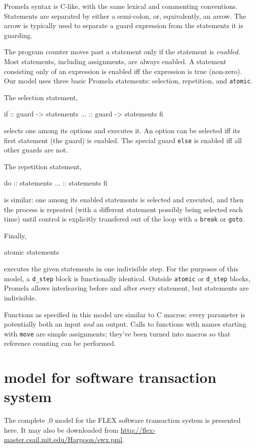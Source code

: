Promela syntax is C-like, with the same lexical and commenting
conventions.  Statements are separated by either a semi-colon, or,
equivalently, an arrow.  The arrow is typically used to separate a
guard expression from the statements it is guarding.

The program counter moves past a statement only if the statement is
{\it enabled}.  Most
statements, including assignments, are always enabled.
A statement consisting only of an expression is enabled iff the
expression is true (non-zero).
Our model uses three basic Promela statements: selection, repetition,
and {\tt atomic}.

The selection statement,
\begin{inlinecode}
if
:: guard -> statements
...
:: guard -> statements
fi
\end{inlinecode}
selects one among its options and executes it.  An option can be
selected iff its first statement (the guard) is enabled.  The
special guard {\tt else} is enabled iff all other guards are not.

The repetition statement,
\begin{inlinecode}
do
:: statements
...
:: statements
fi
\end{inlinecode}
is similar: one among its enabled statements is selected and executed,
and then the process is repeated (with a different statement possibly
being selected each time) until control is explicitly transfered out
of the loop with a {\tt break} or {\tt goto}.

Finally,
\begin{inlinecode}
atomic { statements }
\end{inlinecode}
executes the given statements in one indivisible step.  For the
purposes of this model, a {\tt d\_step} block is functionally identical.
Outside {\tt atomic} or {\tt d\_step} blocks, Promela allows
interleaving before and after every statement, but statements are
indivisible.

Functions as specified in this model are similar to C macros: every
parameter is potentially both an input {\it and} an output.  Calls to
functions with names starting with {\tt move} are simple assignments;
they've been turned into macros so that reference counting
can be performed.

\section{\Spin model for software transaction system}
The complete .0 model for the FLEX software transaction system is
presented here.  It may also be downloaded from
\url{http://flex-master.csail.mit.edu/Harpoon/swx.pml}.

{\footnotesize}
